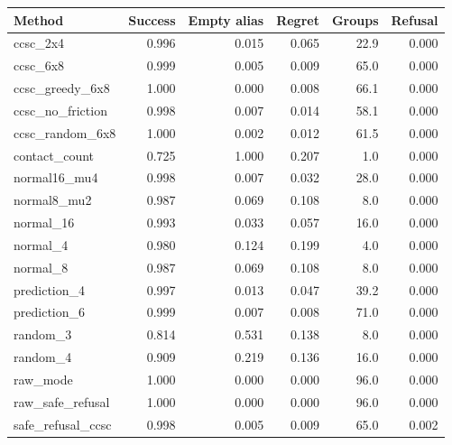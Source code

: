 \begin{tabular}{lrrrrr}
\toprule
Method & Success & Empty alias & Regret & Groups & Refusal \\
\midrule
ccsc\_2x4 & 0.996 & 0.015 & 0.065 & 22.9 & 0.000 \\
ccsc\_6x8 & 0.999 & 0.005 & 0.009 & 65.0 & 0.000 \\
ccsc\_greedy\_6x8 & 1.000 & 0.000 & 0.008 & 66.1 & 0.000 \\
ccsc\_no\_friction & 0.998 & 0.007 & 0.014 & 58.1 & 0.000 \\
ccsc\_random\_6x8 & 1.000 & 0.002 & 0.012 & 61.5 & 0.000 \\
contact\_count & 0.725 & 1.000 & 0.207 & 1.0 & 0.000 \\
normal16\_mu4 & 0.998 & 0.007 & 0.032 & 28.0 & 0.000 \\
normal8\_mu2 & 0.987 & 0.069 & 0.108 & 8.0 & 0.000 \\
normal\_16 & 0.993 & 0.033 & 0.057 & 16.0 & 0.000 \\
normal\_4 & 0.980 & 0.124 & 0.199 & 4.0 & 0.000 \\
normal\_8 & 0.987 & 0.069 & 0.108 & 8.0 & 0.000 \\
prediction\_4 & 0.997 & 0.013 & 0.047 & 39.2 & 0.000 \\
prediction\_6 & 0.999 & 0.007 & 0.008 & 71.0 & 0.000 \\
random\_3 & 0.814 & 0.531 & 0.138 & 8.0 & 0.000 \\
random\_4 & 0.909 & 0.219 & 0.136 & 16.0 & 0.000 \\
raw\_mode & 1.000 & 0.000 & 0.000 & 96.0 & 0.000 \\
raw\_safe\_refusal & 1.000 & 0.000 & 0.000 & 96.0 & 0.000 \\
safe\_refusal\_ccsc & 0.998 & 0.005 & 0.009 & 65.0 & 0.002 \\
\bottomrule
\end{tabular}
